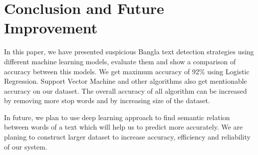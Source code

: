 \section{\textbf{Conclusion and Future Improvement}}
In this paper, we have presented suspicious Bangla text detection strategies using different machine learning models, evaluate them and show a comparison of accuracy between this models. We get maximum accuracy of 92$\%$ using Logistic Regression. Support Vector Machine and other algorithms also get mentionable accuracy on our dataset. The overall accuracy of all algorithm can be increased by removing more stop words and by increasing size of the dataset.\par
In future, we plan to use deep learning approach to find semantic relation between words of a text which will help us to predict more accurately. We are planing to construct larger dataset to increase accuracy, efficiency and reliability of our system.